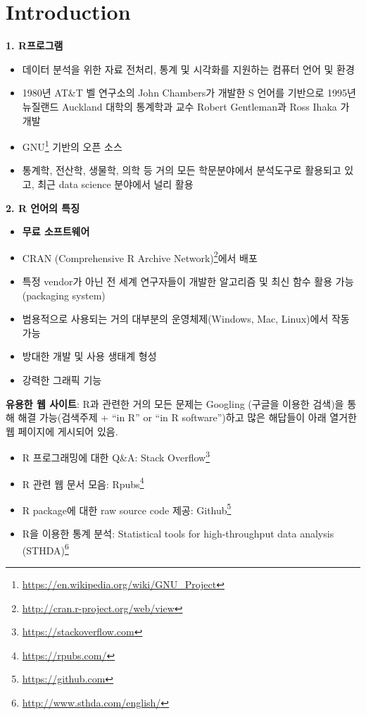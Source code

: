 \documentclass[
  11pt,
]{krantz}
\makeatletter
\providecommand{\tightlist}{%
  \setlength{\itemsep}{0pt}\setlength{\parskip}{0pt}}
\renewcommand{\href}[2]{#2\footnote{\url{#1}}}
\newenvironment{kframe}{%
\medskip{}
\setlength{\fboxsep}{.8em}
 \def\at@end@of@kframe{}%
 \ifinner\ifhmode%
  \def\at@end@of@kframe{\end{minipage}}%
  \begin{minipage}{\columnwidth}%
 \fi\fi%
 \def\FrameCommand##1{\hskip\@totalleftmargin \hskip-\fboxsep
 \colorbox{shadecolor}{##1}\hskip-\fboxsep
     \hskip-\linewidth \hskip-\@totalleftmargin \hskip\columnwidth}%
 \MakeFramed {\advance\hsize-\width
   \@totalleftmargin\z@ \linewidth\hsize
   \@setminipage}}%
 {\par\unskip\endMakeFramed%
 \at@end@of@kframe}
\newenvironment{rmdblock}[1]
  {
  \begin{itemize}
  \renewcommand{\labelitemi}{
    \raisebox{-.7\height}[0pt][0pt]{
      {\setkeys{Gin}{width=3em,keepaspectratio}\texttt{[image: images/\#1]}}
    }
  }
  \setlength{\fboxsep}{1em}
  \begin{kframe}
  \item
  }
  {
  \end{kframe}
  \end{itemize}
  }
\newenvironment{rmdtip}
  {\begin{rmdblock}{tip}}
  {\end{rmdblock}}
\makeatother
\begin{document}
\hypertarget{intro-chap}{%
\chapter{Introduction}\label{intro-chap}}

\textbf{1. R프로그램}

\begin{itemize}
\tightlist
\item
  데이터 분석을 위한 자료 전처리, 통계 및 시각화를 지원하는 컴퓨터 언어 및 환경
\item
  1980년 AT\&T 벨 연구소의 John Chambers가 개발한 S 언어를 기반으로 1995년 뉴질랜드 Auckland 대학의 통계학과 교수 Robert Gentleman과 Ross Ihaka 가 개발
\item
  \href{https://en.wikipedia.org/wiki/GNU_Project}{GNU} 기반의 오픈 소스
\item
  통계학, 전산학, 생물학, 의학 등 거의 모든 학문분야에서 분석도구로 활용되고 있고, 최근 data science 분야에서 널리 활용
\end{itemize}

\textbf{2. R 언어의 특징}

\begin{itemize}
\tightlist
\item
  \textbf{무료 소프트웨어}
\item
  \href{http://cran.r-project.org/web/view}{CRAN (Comprehensive R Archive Network)}에서 배포
\item
  특정 vendor가 아닌 전 세계 연구자들이 개발한 알고리즘 및 최신 함수 활용 가능(packaging system)
\item
  범용적으로 사용되는 거의 대부분의 운영체제(Windows, Mac, Linux)에서 작동 가능
\item
  방대한 개발 및 사용 생태계 형성
\item
  강력한 그래픽 기능
\end{itemize}

\footnotesize

\begin{rmdtip}
\begin{rmdtip}

\textbf{유용한 웹 사이트}: R과 관련한 거의 모든 문제는 Googling (구글을 이용한 검색)을 통해 해결 가능(검색주제 + ``in R'' or ``in R software'')하고 많은 해답들이 아래 열거한 웹 페이지에 게시되어 있음.

\begin{itemize}
\tightlist
\item
  R 프로그래밍에 대한 Q\&A: \href{https://stackoverflow.com}{Stack Overflow}
\item
  R 관련 웹 문서 모음: \href{https://rpubs.com/}{Rpubs}
\item
  R package에 대한 raw source code 제공: \href{https://github.com}{Github}
\item
  R을 이용한 통계 분석: \href{http://www.sthda.com/english/}{Statistical tools for high-throughput data analysis (STHDA)}
\end{itemize}

\end{rmdtip}
\end{rmdtip}
\end{document}
